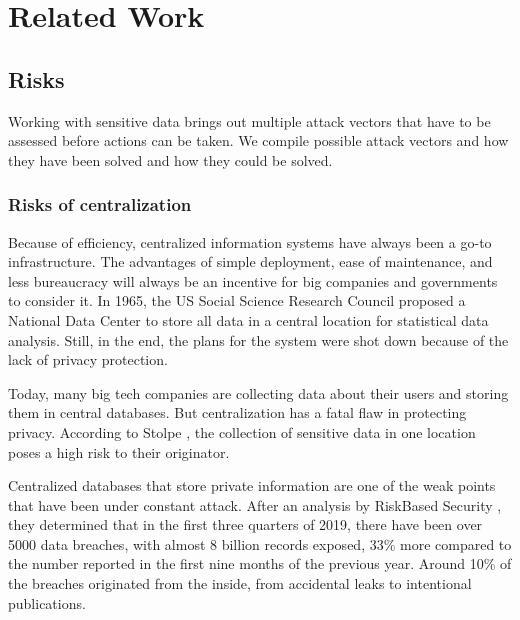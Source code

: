 
\chapter{Related Work}\label{chapter:relatedwork}
\section{Risks}
Working with sensitive data brings out multiple attack vectors that have to be assessed before actions can be taken. We compile possible attack vectors and how they have been solved and how they could be solved.

\subsection{Risks of centralization}
Because of efficiency, centralized information systems have always been a go-to infrastructure. The advantages of simple deployment, ease of maintenance, and less bureaucracy will always be an incentive for big companies and governments to consider it. In 1965, the US Social Science Research Council \cite{lawreview} proposed a National Data Center to store all data in a central location for statistical data analysis. Still, in the end, the plans for the system were shot down because of the lack of privacy protection.

Today, many big tech companies are collecting data about their users and storing them in central databases. But centralization has a fatal flaw in protecting privacy. According to Stolpe \cite{DBLP:journals/sigkdd/Stolpe16}, the collection of sensitive data in one location poses a high risk to their originator.

 Centralized databases that store private information are one of the weak points that have been under constant attack. After an analysis by RiskBased Security \cite{riskbasedsecurity}, they determined that in the first three quarters of 2019, there have been over 5000 data breaches, with almost 8 billion records exposed, 33\% more compared to the number reported in the first nine months of the previous year. Around 10\% of the breaches originated from the inside, from accidental leaks to intentional publications.

